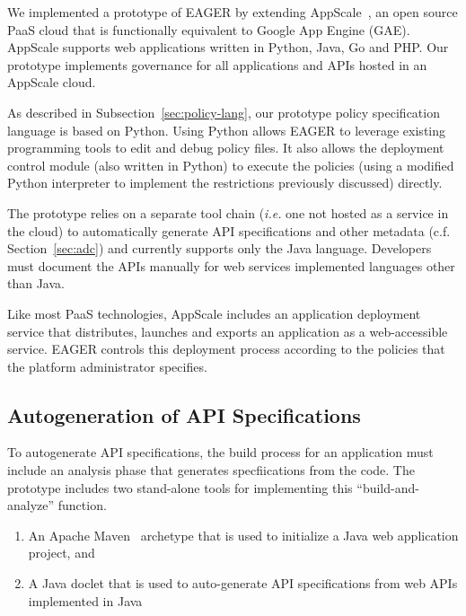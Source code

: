 We implemented a prototype of EAGER by extending AppScale~\cite{appscale13}, 
an open source PaaS cloud that is 
functionally equivalent to Google App Engine (GAE).  AppScale supports
web applications written in Python, Java, Go and PHP. Our prototype
implements governance for all applications and APIs hosted in an AppScale cloud. 

As described in Subsection~\ref{sec:policy-lang}, 
our prototype policy specification
language is based on Python.
Using Python allows EAGER to leverage
existing programming tools to edit and debug policy files. 
It also allows the deployment control module (also written in Python) to
execute the policies (using a modified Python interpreter to implement the
restrictions previously discussed) directly.


The prototype relies on a separate tool chain ({\em i.e.} one not hosted as a
service in the cloud) to automatically generate
API specifications and other metadata (c.f. Section~\ref{sec:adc}) and
currently supports only the Java language.  
Developers must document the APIs manually
for web services implemented languages other than Java.

Like most PaaS technologies, AppScale includes an application deployment
service that distributes, launches and exports an application
as a web-accessible service.  EAGER controls this deployment
process according to the policies that the platform administrator specifies.

\subsection{Autogeneration of API Specifications}
To autogenerate API specifications, the build process for an application must
include an analysis phase that generates specfiications from the code.
The prototype includes two stand-alone tools for implementing this
``build-and-analyze'' function.
\begin{enumerate}
\vspace{0.05in}
\item An Apache Maven~\cite{maven} archetype that is used to initialize a Java
web application project, and 
\vspace{0.05in}
\item A Java doclet that is used to auto-generate API specifications from web APIs implemented in Java
\vspace{0.05in}
\end{enumerate}

